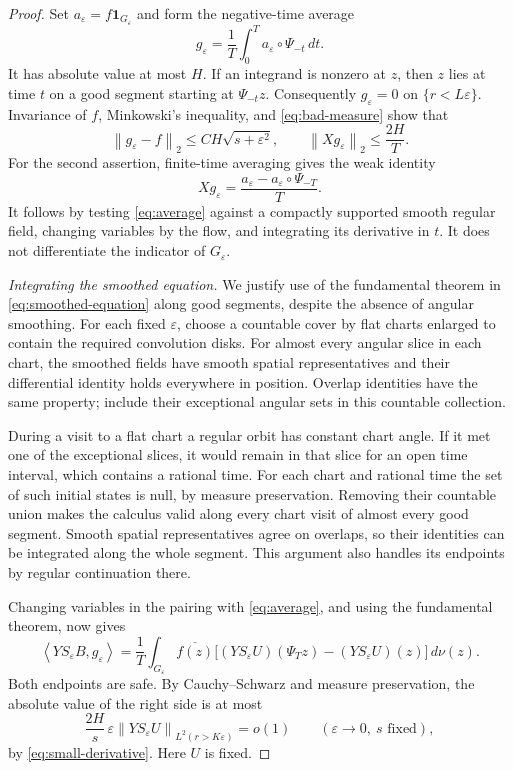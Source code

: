 \documentclass[11pt]{article}
\theoremstyle{remark}
\newcommand{\dd}{\,d}
\newcommand{\ind}{\mathbf 1}
\newcommand{\eps}{\varepsilon}
\newcommand{\norm}[1]{\left\lVert#1\right\rVert}
\newcommand{\ip}[2]{\left\langle#1,#2\right\rangle}
\begin{document}
\begin{proof}
Set \(a_\eps=f\ind_{G_\eps}\) and form the negative-time average
\begin{equation}\label{eq:average}
 g_\eps=\frac1T\int_0^T a_\eps\circ\Psi_{-t}\dd t.
\end{equation}
It has absolute value at most \(H\). If an integrand is nonzero at
\(z\), then \(z\) lies at time \(t\) on a good segment starting
at \(\Psi_{-t}z\). Consequently \(g_\eps=0\) on
\(\{r<L\eps\}\). Invariance of \(f\), Minkowski's inequality,
and \eqref{eq:bad-measure} show that
\begin{equation}\label{eq:average-bounds}
 \norm{g_\eps-f}_2\le CH\sqrt{s+\eps^2},\qquad
 \norm{Xg_\eps}_2\le\frac{2H}{T}.
\end{equation}
For the second assertion, finite-time averaging gives the weak identity
\[
 Xg_\eps=\frac{a_\eps-a_\eps\circ\Psi_{-T}}{T}.
\]
It follows by testing \eqref{eq:average} against a compactly supported
smooth regular field, changing variables by the flow, and integrating
its derivative in \(t\). It does not differentiate the indicator of
\(G_\eps\).

\medskip\noindent\emph{Integrating the smoothed equation.}
We justify use of the fundamental theorem in
\eqref{eq:smoothed-equation} along good segments, despite the absence
of angular smoothing. For each fixed \(\eps\), choose a countable cover
by flat charts enlarged
to contain the required convolution disks. For almost every angular
slice in each chart, the smoothed fields have smooth spatial
representatives and their differential identity holds everywhere in
position. Overlap identities have the same property; include their
exceptional angular sets in this countable collection.

During a visit to a flat chart a regular orbit has constant chart angle.
If it met one of the exceptional slices, it would remain in that slice
for an open time interval, which contains a rational time. For each
chart and rational time the set of such initial states is null, by
measure preservation. Removing their countable union makes the calculus
valid along every chart visit of almost every good segment. Smooth
spatial representatives agree on overlaps, so their identities can be
integrated along the whole segment. This argument also handles its
endpoints by regular continuation there.

Changing variables in the pairing with \eqref{eq:average}, and using
the fundamental theorem, now gives
\begin{equation}\label{eq:segment-identity}
 \ip{Y S_\eps B}{g_\eps}
 =\frac1T\int_{G_\eps}\overline{f(z)}
   \bigl[(Y S_\eps U)(\Psi_T z)-(Y S_\eps U)(z)\bigr]\dd\nu(z).
\end{equation}
Both endpoints are safe. By Cauchy--Schwarz and measure preservation,
the absolute value of the right side is at most
\[
 \frac{2H}{s}\,\eps\norm{Y S_\eps U}_{L^2(r>K\eps)}=o(1)
                 \qquad(\eps\to0,\ s\text{ fixed}),
\]
by \eqref{eq:small-derivative}. Here \(U\) is fixed.


\end{proof}
\end{document}

